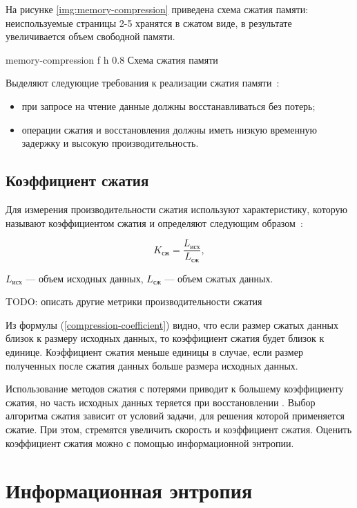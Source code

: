 На рисунке \ref{img:memory-compression} приведена схема сжатия памяти: неиспользуемые страницы 2-5 хранятся в сжатом виде, в результате увеличивается объем свободной памяти.

    {memory-compression}
    {f}
    {h}
    {0.8\textwidth}
    {Схема сжатия памяти}

Выделяют следующие требования к реализации сжатия памяти~\cite{compression-requirements}:

\begin{itemize}
	\item при запросе на чтение данные должны восстанавливаться без потерь;
	\item операции сжатия и восстановления должны иметь низкую временную задержку и высокую производительность.
\end{itemize}

\subsection{Коэффициент сжатия}

Для измерения производительности сжатия используют характеристику, которую называют коэффициентом сжатия и определяют следующим образом~\cite{compression-coefficient}:

\begin{equation}\label{compression-coefficient}
	K_{\text{сж}} = \frac{L_{\text{исх}}}{L_{\text{сж}}},
\end{equation}

 $L_{\text{исх}}$ --- объем исходных данных, $L_{\text{сж}}$ --- объем сжатых данных.

TODO: описать другие метрики производительности сжатия

Из формулы (\ref{compression-coefficient}) видно, что если размер сжатых данных близок к размеру исходных данных, то коэффициент сжатия будет близок к единице. Коэффициент сжатия меньше единицы в случае, если размер полученных после сжатия данных больше размера исходных данных.

Использование методов сжатия с потерями приводит к большему коэффициенту сжатия, но часть исходных данных теряется при восстановлении \cite{compression-definition}. Выбор алгоритма сжатия зависит от условий задачи, для решения которой применяется сжатие. При этом, стремятся увеличить скорость и коэффициент сжатия. Оценить коэффициент сжатия можно с помощью информационной энтропии.

\section{Информационная энтропия}\label{ientropy}

